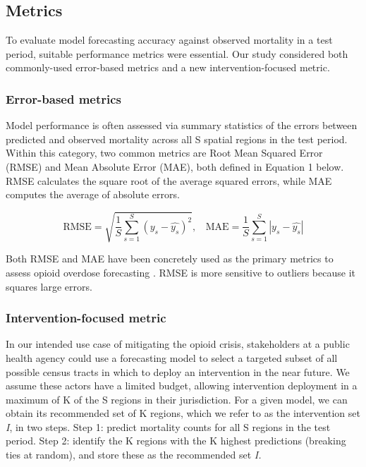 \subsection{Metrics}\label{metrics}

To evaluate model forecasting accuracy against observed mortality in a test period, suitable performance metrics were essential. Our study considered both commonly-used error-based metrics and a new intervention-focused metric.

\subsubsection{Error-based metrics}\label{error-based-metrics}

Model performance is often assessed via summary statistics of the errors between predicted and observed mortality across all S spatial regions in the test period. Within this category, two common metrics are Root Mean Squared Error (RMSE) and Mean Absolute Error (MAE), both defined in Equation 1 below. RMSE calculates the square root of the average squared errors, while MAE computes the average of absolute errors.

\begin{equation}
    \text{RMSE} = \sqrt{\frac{1}{S}\sum_{s = 1}^{S}(y_{s} - \widehat{y_{s}})^{2}},\ \ \ \ \text{MAE} = \frac{1}{S}\sum_{s = 1}^{S}|y_{s} - \widehat{y_{s}}|
\end{equation}

Both RMSE and MAE have been concretely used as the primary metrics to assess opioid overdose forecasting \citep{ertugrulCASTNetCommunityAttentiveSpatioTemporal2019,bauerSmallAreaForecasting2023, sumetskySpatiotemporalModelingOpioid2017}
. RMSE is more sensitive to outliers because it squares large errors.

\subsubsection{Intervention-focused metric}\label{intervention-focused-metric}

In our intended use case of mitigating the opioid crisis, stakeholders at a public health agency could use a forecasting model to select a targeted subset of all possible census tracts in which to deploy an intervention in the near future. We assume these actors have a limited budget, allowing intervention deployment in a maximum of K of the S regions in their jurisdiction. For a given model, we can obtain its recommended set of K regions, which we refer to as the intervention set \emph{I}, in two steps. Step 1: predict mortality counts for all S regions in the test period. Step 2: identify the K regions with the K highest predictions (breaking ties at random), and store these as the recommended set \emph{I.}

